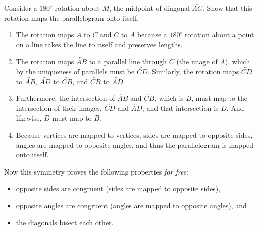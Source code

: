 \documentclass[nooutcomes]{ximera}
\begin{document}
\begin{problem}
Consider a $180^\circ$ rotation about $M$, the midpoint of diagonal $\overline{AC}$.  Show that this rotation maps the parallelogram onto itself.  
\begin{enumerate}
\item The rotation maps $A$ to $C$ and $C$ to $A$ because a $180^\circ$ rotation about a point on a line takes the line to itself and preserves lengths.
\item The rotation maps $\overleftrightarrow{AB}$ to a parallel line through $C$ (the image of $A$), which by the uniqueness of parallels must 
be $\overleftrightarrow{CD}$.  Similarly, the rotation maps 
$\overleftrightarrow{CD}$ to $\overleftrightarrow{AB}$, 
$\overleftrightarrow{AD}$ to $\overleftrightarrow{CB}$, and
$\overleftrightarrow{CB}$ to $\overleftrightarrow{AD}$.
\item Furthermore, the intersection of $\overleftrightarrow{AB}$ and $\overleftrightarrow{CB}$, which is $B$, must map to the intersection of their images, $\overleftrightarrow{CD}$ and $\overleftrightarrow{AD}$, and that intersection is $D$.  And likewise, $D$ must map to $B$.
\item Because vertices are mapped to vertices, sides are mapped to opposite sides, angles are mapped to opposite angles, and thus the parallelogram is mapped onto itself.  
\end{enumerate}

Now this symmetry proves the following properties \emph{for free}:  

\begin{itemize}
\item opposite sides are congruent (sides are mapped to opposite sides), 
\item opposite angles are congruent (angles are mapped to opposite angles), and 
\item the diagonals bisect each other.

\end{itemize}

\end{problem}
\end{document}
